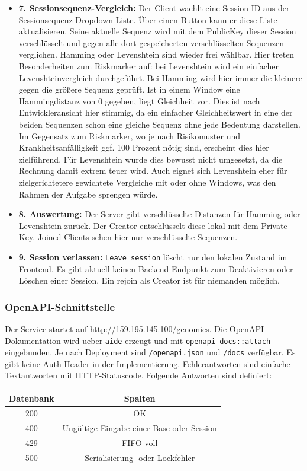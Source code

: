 \begin{itemize}
\item
  \textbf{7. Sessionsequenz-Vergleich:} Der Client waehlt eine Session-ID
  aus der Sessionsequenz-Dropdown-Liste. Über einen Button kann er diese Liste aktualisieren. Seine aktuelle Sequenz wird mit
  dem PublicKey dieser Session verschlüsselt und gegen alle dort
  gespeicherten verschlüsselten Sequenzen verglichen. Hamming oder Levenshtein sind wieder frei wählbar. Hier treten Besonderheiten zum Riskmarker auf: bei Levenshtein wird ein einfacher Levenshteinvergleich durchgeführt. Bei Hamming wird hier immer die kleinere gegen die größere Sequenz geprüft. Ist in einem Window eine Hammingdistanz von 0 gegeben, liegt Gleichheit vor. Dies ist nach Entwickleransicht hier stimmig, da ein einfacher Gleichheitswert in eine der beiden Sequenzen schon eine gleiche Sequenz ohne jede Bedeutung darstellen. Im Gegensatz zum Riskmarker, wo je nach Risikomuster und Krankheitsanfälligkeit ggf. 100 Prozent nötig sind, erscheint dies hier zielführend. Für Levenshtein wurde dies bewusst nicht umgesetzt, da die Rechnung damit extrem teuer wird. Auch eignet sich Levenshtein eher für zielgerichtetere gewichtete Vergleiche mit oder ohne Windows, was den Rahmen der Aufgabe sprengen würde. 
\item
  \textbf{8. Auswertung:} Der Server gibt verschlüsselte
  Distanzen für Hamming oder Levenshtein zurück. Der Creator entschlüsselt diese lokal mit dem Private-Key. Joined-Clients sehen hier nur verschlüsselte Sequenzen.
\item
  \textbf{9. Session verlassen:} \texttt{Leave\ session} löscht nur den
  lokalen Zustand im Frontend. Es gibt aktuell keinen Backend-Endpunkt zum Deaktivieren oder Löschen einer Session. Ein rejoin als Creator ist für niemanden möglich.
  
\end{itemize}

\subsubsection{OpenAPI-Schnittstelle}
Der Service startet auf http://159.195.145.100/genomics. Die OpenAPI-Dokumentation wird ueber \texttt{aide} erzeugt und mit
\texttt{openapi-docs::attach} eingebunden. Je nach Deployment sind
\texttt{/openapi.json} und \texttt{/docs} verfügbar. Es gibt keine
Auth-Header in der Implementierung. Fehlerantworten sind einfache
Textantworten mit HTTP-Statuscode. Folgende Antworten sind definiert:

\begin{table}[h]
    \centering
    \begin{tabular}{|c|c|}
    \hline
    \textbf{Datenbank} & \textbf{Spalten}  \\
    \hline
    \hline
    200 & OK \\
    \hline
    400 & Ungültige Eingabe einer Base oder Session \\
    \hline
    429 & FIFO voll \\
    \hline
    500 & Serialisierung- oder Lockfehler \\
    \hline
    \end{tabular}
    \end{table}


